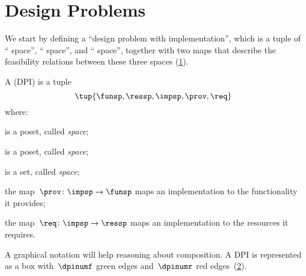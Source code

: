 

\section{Design Problems}
\label{sec:Design-Problems}

We start by defining a ``design problem with implementation'', which is a tuple of `` space'', `` space'', and `` space'', together with two maps that describe the feasibility relations between these three spaces (\cref{fig:setup}).

\begin{definition}
  \label{def:DPI}
  A \emph{} (DPI) is a tuple
  \begin{equation}
    \tup{\funsp, \ressp, \impsp, \prov,\req}
  \end{equation}
  where:

  \begin{compactitem}
    \item \funsp is a poset, called \emph{ space};
    \item \ressp is a poset, called \emph{ space};
    \item \impsp is a set, called \emph{ space};
    \item the map~$\prov\colon\impsp\rightarrow\funsp$
    maps an implementation to the functionality it provides;
    \item the map~$\req\colon\impsp\rightarrow\ressp$
    maps an implementation to the resources it requires.
  \end{compactitem}

\end{definition}

\begin{figure}[h]
  \begin{center}
  \end{center}
  \caption{\label{fig:setup}}
\end{figure}


A graphical notation will help reasoning about composition. A DPI is represented as a box with~$\dpinumf$ green edges and~$\dpinumr$ red edges~(\cref{fig:dp_graphical}).

\begin{figure}[h]
  \centering
  \caption{\label{fig:dp_graphical}}
\end{figure}

